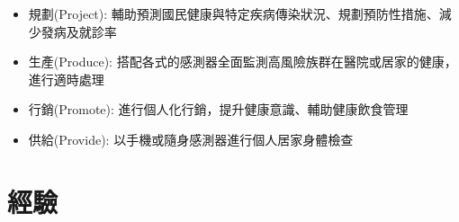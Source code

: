 \documentclass[a4paper,12pt]{article}
\begin{document}
\begin{itemize}
\begin{itemize}
\item 規劃(Project): 輔助預測國民健康與特定疾病傳染狀況、規劃預防性措施、減少發病及就診率\\
\item 生產(Produce): 搭配各式的感測器全面監測高風險族群在醫院或居家的健康，進行適時處理\\
\item 行銷(Promote): 進行個人化行銷，提升健康意識、輔助健康飲食管理\\
\item 供給(Provide): 以手機或隨身感測器進行個人居家身體檢查\\
\end{itemize}
\end{itemize}

\section{經驗}
\label{sec:org1df0961}
\end{document}
